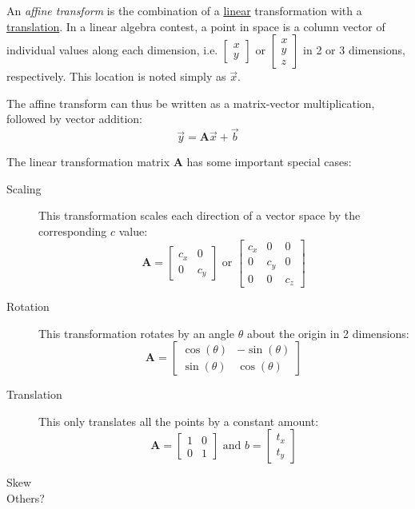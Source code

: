 An \emph{affine transform} is the combination of a \underline{linear} transformation with a \underline{translation}. In a linear algebra contest, a point in space is a column vector of individual values along each dimension, i.e. $\left[\begin{matrix}x\\y\end{matrix}\right]$ or $\left[\begin{matrix}x\\y\\z\end{matrix}\right]$ in 2 or 3 dimensions, respectively. This location is noted simply as $\vec{x}$.

The affine transform can thus be written as a matrix-vector multiplication, followed by vector addition:
\begin{equation}
\vec{y} = \mathbf{A}\vec{x} + \vec{b}
\end{equation}

The linear transformation matrix $\mathbf{A}$ has some important special cases:
\begin{description}
	\item[Scaling] This transformation scales each direction of a vector space by the corresponding $c$ value: $$\mathbf{A}=\left[\begin{matrix}
	c_x & 0 \\ 0 & c_y
	\end{matrix}\right] \text{ or } \left[\begin{matrix}
	c_x & 0 &0\\ 0 & c_y &0\\ 0&0&c_z
	\end{matrix}\right]$$
	
	\item[Rotation] This transformation rotates by an angle $\theta$ about the origin in 2 dimensions:$$\mathbf{A}=\left[\begin{matrix}
	\cos(\theta) & -\sin(\theta) \\\sin(\theta) & \cos(\theta)
	\end{matrix}\right]$$ 

	\item[Translation] This only translates all the points by a constant amount:$$\mathbf{A}=\left[\begin{matrix}
	1 & 0 \\0 &1
	\end{matrix}\right] \text{ and } b=\left[\begin{matrix}t_x\\t_y\end{matrix}\right]$$
	
	\item[Skew]
	
	\item[Others?]
	
\end{description}

